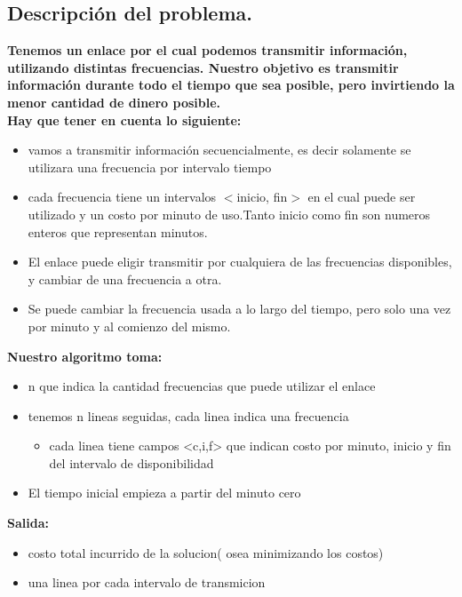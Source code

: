 \subsection{Descripción del problema.}

\vspace*{0.3cm}

\textbf{
Tenemos un enlace por el cual podemos transmitir información, utilizando distintas frecuencias.
Nuestro objetivo es transmitir información durante todo el tiempo que sea posible, pero invirtiendo la menor cantidad de dinero posible.
\\
Hay que tener en cuenta lo siguiente:
}
\begin{itemize}
	\item vamos a transmitir información secuencialmente, es decir solamente se utilizara una frecuencia por intervalo tiempo 
	\item cada frecuencia tiene un intervalos $<$inicio, fin$>$ en el cual puede ser utilizado y un costo por minuto de uso.Tanto inicio como fin son numeros enteros que representan minutos. 
	\item El enlace puede eligir transmitir por cualquiera de las frecuencias disponibles, y cambiar de una frecuencia a otra.
	\item Se puede cambiar la frecuencia usada a lo largo del tiempo, pero solo una vez por minuto y al comienzo del mismo.
\end{itemize}

\textbf{Nuestro algoritmo toma:}
\begin{itemize}
	\item n que indica la cantidad frecuencias que puede utilizar el enlace
	\item tenemos n lineas seguidas, cada linea indica una frecuencia
	\begin{itemize}
		\item cada linea tiene campos <c,i,f> que indican costo por minuto, inicio y fin del intervalo de disponibilidad
	\end{itemize}
	\item El tiempo inicial empieza a partir del minuto cero
\end{itemize}

\textbf{Salida:}
\begin{itemize}
	  \item costo total incurrido de la solucion( osea minimizando los costos)
	  \item una linea por cada intervalo de transmicion 
\end{itemize}


